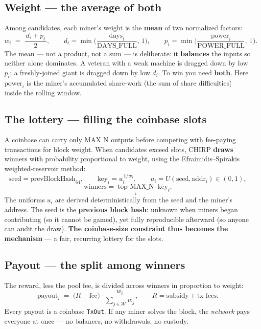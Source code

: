 \documentclass[11pt]{article}
\begin{document}
\subsection{Weight --- the average of both}
Among candidates, each miner's weight is the \textbf{mean} of two normalized factors:
\[
  w_i \;=\; \frac{\,d_i + p_i\,}{2},
  \qquad
  d_i = \min\!\Big(\frac{\text{days}_i}{\text{DAYS\_FULL}},\, 1\Big),
  \qquad
  p_i = \min\!\Big(\frac{\text{power}_i}{\text{POWER\_FULL}},\, 1\Big).
\]
The mean --- not a product, not a sum --- is deliberate: it \textbf{balances} the inputs so neither
alone dominates. A veteran with a weak machine is dragged down by low $p_i$; a freshly-joined giant
is dragged down by low $d_i$. To win you need \textbf{both}. Here $\text{power}_i$ is the miner's
accumulated share-work (the sum of share difficulties) inside the rolling window.

\subsection{The lottery --- filling the coinbase slots}
A coinbase can carry only $\text{MAX\_N}$ outputs before competing with fee-paying transactions for
block weight. When candidates exceed slots, CHIRP \textbf{draws} winners with probability
proportional to weight, using the Efraimidis--Spirakis weighted-reservoir method:
\[
  \text{seed} = \text{prevBlockHash}_{64},
  \qquad
  \text{key}_i = u_i^{\,1/w_i},
  \qquad
  u_i = U(\text{seed}, \text{addr}_i) \in (0,1),
\]
\[
  \text{winners} = \operatorname*{top\text{-}MAX\_N}_{i}\; \text{key}_i .
\]
The uniforms $u_i$ are derived deterministically from the seed and the miner's address. The seed is
the \textbf{previous block hash}: unknown when miners began contributing (so it cannot be gamed),
yet fully reproducible afterward (so anyone can audit the draw). \textbf{The coinbase-size constraint
thus becomes the mechanism} --- a fair, recurring lottery for the slots.

\subsection{Payout --- the split among winners}
The reward, less the pool fee, is divided across winners in proportion to weight:
\[
  \text{payout}_i \;=\; \big(R - \text{fee}\big)\cdot
  \frac{w_i}{\displaystyle\sum_{j \in \mathcal{W}} w_j},
  \qquad
  R = \text{subsidy} + \text{tx fees}.
\]
Every payout is a coinbase \texttt{TxOut}. If any miner solves the block, the \emph{network} pays
everyone at once --- no balances, no withdrawals, no custody.
\end{document}
